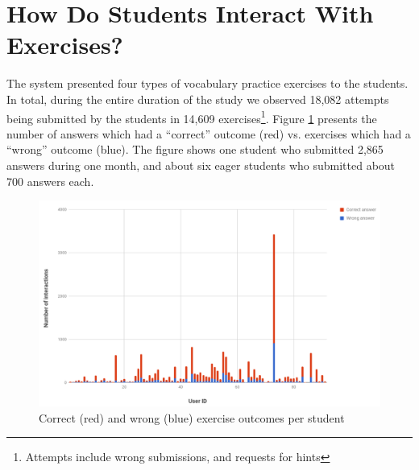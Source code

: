 





\newpage
\section{How Do Students Interact With Exercises?}

The system presented four types of vocabulary practice exercises to the students. In total, during the entire duration of the study we observed 18,082 attempts being submitted by the students in 14,609 exercises\footnote{Attempts include wrong submissions, and requests for hints}. Figure \ref{fig:ex_interactions} presents the number of answers which had a ``correct'' outcome (red) vs. exercises which had a ``wrong'' outcome (blue). The figure shows one student who submitted 2,865 answers during one month, and about six eager students who submitted about  700 answers each. 

  \begin{figure}[h!]
  \centering
    \includegraphics[width=0.9\columnwidth]{figures/exercise_interactions_count.png}
    \caption{Correct (red) and wrong (blue) exercise outcomes per student}
    \label{fig:ex_interactions}
  \end{figure}


